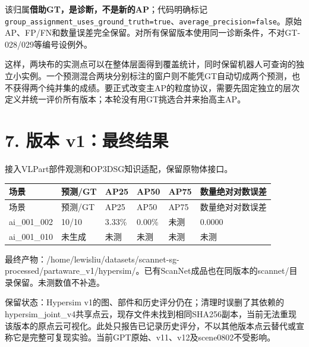 \documentclass[UTF8,fontset=fandol]{ctexart}
\begin{document}
该归属\textbf{借助GT，是诊断，不是新的AP}；代码明确标记 \texttt{group\_\allowbreak{}assignment\_\allowbreak{}uses\_\allowbreak{}ground\_\allowbreak{}truth=true}、\texttt{average\_\allowbreak{}precision=false}。原始AP、FP/FN和数量误差完全保留。对所有保留版本使用同一诊断条件，不对GT-028/029等编号设例外。



这样，两块布的实测点可以在整体层面得到覆盖统计，同时保留机器人可查询的独立小实例。一个预测混合两块分别标注的窗户则不能凭GT自动切成两个预测，也不获得两个纯并集的成绩。要正式改变主AP的粒度协议，需要先固定独立的层次定义并统一评价所有版本；本轮没有用GT挑选合并来抬高主AP。



\section*{7. 版本 v1：最终结果}

接入VLPart部件观测和OP3DSG知识适配，保留原物体接口。



{\small
\begin{longtable}{|p{}|p{}|p{}|p{}|p{}|p{}|}
\hline
场景 & 预测/GT & AP25 & AP50 & AP75 & 数量绝对对数误差 \\ \hline
\endfirsthead
\hline
场景 & 预测/GT & AP25 & AP50 & AP75 & 数量绝对对数误差 \\ \hline
\endhead
ai\_001\_002 & 10/10 & 3.33\% & 0.00\% & 未测 & 0.0000 \\ \hline
ai\_001\_010 & 未生成 & 未测 & 未测 & 未测 & 未测 \\ \hline
\end{longtable}
}

最终产物：/home/lewisliu/datasets/scannet-sg-processed/partaware\_v1/hypersim/。已有ScanNet成品也在同版本的scannet/目录保留。未测数值不补造。



保留状态：Hypersim v1的图、部件和历史评分仍在；清理时误删了其依赖的hypersim\_joint\_v4共享点云，现存文件未找到相同SHA256副本，当前无法重现该版本的原点云可视化。此处只报告已记录历史评分，不以其他版本点云替代或宣称它是完整可复现实验。当前GPT原始、v11、v12及scene0802不受影响。
\end{document}
